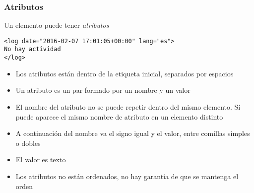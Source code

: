 \documentclass[ucs]{beamer}
\begin{document}
\begin{frame}[fragile]
\frametitle{Atributos}
Un elemento puede tener \emph{atributos}


  \begin{footnotesize}
  \begin{verbatim}
<log date="2016-02-07 17:01:05+00:00" lang="es">
No hay actividad
</log>
  \end{verbatim}
  \end{footnotesize}

\begin{itemize}
\item
Los atributos
están dentro de la etiqueta inicial,  separados por espacios
\item
Un atributo
es un par formado por un nombre y un valor

\item
El nombre del atributo no se puede repetir dentro del mismo elemento. Sí puede aparece
el mismo nombre de atributo en un elemento distinto
\item
A continuación del nombre va el signo igual
y el valor, entre comillas simples o dobles
\item
El valor es texto
\item
Los atributos no están ordenados, no hay garantía de que se mantenga
el orden
\end{itemize}

\end{frame}
\end{document}

